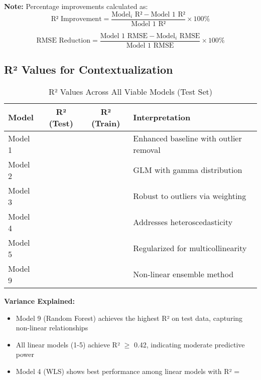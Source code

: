 \textbf{Note:} Percentage improvements calculated as:
\begin{equation}
\text{R² Improvement} = \frac{\text{Model}_i\text{ R²} - \text{Model 1 R²}}{\text{Model 1 R²}} \times 100\%
\end{equation}

\begin{equation}
\text{RMSE Reduction} = \frac{\text{Model 1 RMSE} - \text{Model}_i\text{ RMSE}}{\text{Model 1 RMSE}} \times 100\%
\end{equation}


\subsection{R² Values for Contextualization}

\begin{table}[h!]
\centering
\caption{R² Values Across All Viable Models (Test Set)}
\label{tab:r2_comparison}
\begin{tabular}{lccl}
\toprule
\textbf{Model} & \textbf{R² (Test)} & \textbf{R² (Train)} & \textbf{Interpretation} \\
\midrule
Model 1 & \ModelOneRSquaredTest{} & \ModelOneRSquaredTrain{} & Enhanced baseline with outlier removal \\
Model 2 & \ModelTwoRSquaredTest{} & \ModelTwoRSquaredTrain{} & GLM with gamma distribution \\
Model 3 & \ModelThreeRSquaredTest{} & \ModelThreeRSquaredTrain{} & Robust to outliers via weighting \\
Model 4 & \ModelFourRSquaredTest{} & \ModelFourRSquaredTrain{} & Addresses heteroscedasticity \\
Model 5 & \ModelFiveRSquaredTest{} & \ModelFiveRSquaredTrain{} & Regularized for multicollinearity \\
Model 9 & \ModelNineRSquaredTest{} & \ModelNineRSquaredTrain{} & Non-linear ensemble method \\
\bottomrule
\end{tabular}
\end{table}

\textbf{Variance Explained:}
\begin{itemize}
    \item Model 9 (Random Forest) achieves the highest R² on test data, capturing non-linear relationships
    \item All linear models (1-5) achieve R² $\geq$ 0.42, indicating moderate predictive power
    \item Model 4 (WLS) shows best performance among linear models with R² = \ModelFourRSquaredTest{}
\end{itemize}


